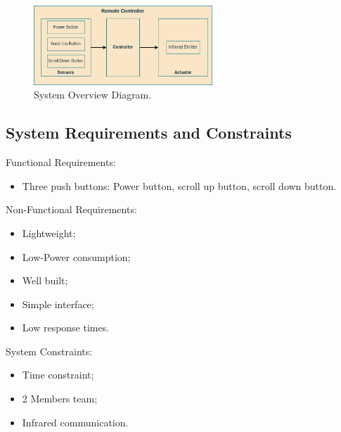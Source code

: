 \documentclass[12pt, letterpaper]{report}
\begin{document}
\begin{figure}[ht]
	\centering
	\includegraphics[width=0.60\textwidth]{SysOverview}
	\caption{System Overview Diagram.}
	\label{fig:sys_overview}
\end{figure}

\subsection{System Requirements and Constraints}

Functional Requirements:

\begin{itemize}
    \item Three push buttons: Power button, scroll up button, scroll down button.\\
\end{itemize}

Non-Functional Requirements:
\begin{itemize}
    \item Lightweight;
    \item Low-Power consumption;
    \item Well built;
    \item Simple interface;
    \item Low response times.\\
\end{itemize}

System Constraints:
\begin{itemize}
    \item Time constraint;
    \item 2 Members team;
    \item Infrared communication.\\
\end{itemize}

\end{document}
